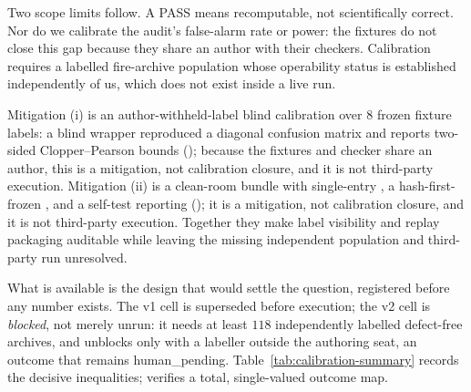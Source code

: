\documentclass{article}
\begin{document}
Two scope limits follow. A PASS means recomputable, not scientifically correct. Nor do we
calibrate the audit's false-alarm rate or power: the fixtures do not close this gap because
they share an author with their checkers. Calibration requires a labelled fire-archive
population whose operability status is established independently of us, which does not
exist inside a live run.

Mitigation (i) is an author-withheld-label blind calibration over $8$ frozen fixture labels: a blind wrapper reproduced a diagonal confusion matrix and reports two-sided Clopper--Pearson bounds (); because the fixtures and checker share an author, this is a mitigation, not calibration closure, and it is not third-party execution. Mitigation (ii) is a clean-room bundle with single-entry , a hash-first-frozen , and a self-test reporting  (); it is a mitigation, not calibration closure, and it is not third-party execution. Together they make label visibility and replay packaging auditable while leaving the missing independent population and third-party run unresolved.

What is available is the design that would settle the question, registered before any
number exists. The v1 cell is superseded before execution; the v2 cell is \emph{blocked},
not merely unrun: it needs at least $118$ independently labelled defect-free archives, and
unblocks only with a labeller outside the authoring seat, an outcome that remains
human{\_}pending. Table~\ref{tab:calibration-summary} records the decisive inequalities;
 verifies a total, single-valued outcome
map.
\end{document}
